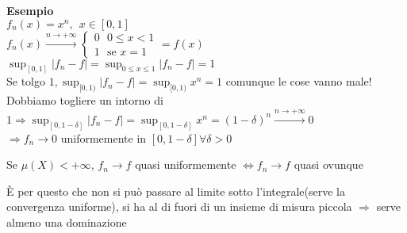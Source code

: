 \documentclass[12px]{article}
\begin{document}
\textbf{Esempio}\\
$f_n(x) = x^n, \ \ x\in [0,1]$\\
$f_n(x) \xrightarrow{ n \rightarrow+\infty} \begin{cases}
	0 \ \ \ 0\leq x < 1\\
	1 \ \ \ \text{se } x = 1
\end{cases}=f(x)$\\
$\sup_{[0,1]}|f_n-f| = \sup_{0\leq x\leq 1}|f_n-f| = 1$\\
Se tolgo  $1, \sup_{[0,1)}|f_n-f| = \sup_{[0,1)}x^n = 1$ comunque le cose vanno male!\\
Dobbiamo togliere un intorno di  $1 \Rightarrow \sup_{[0,1-\delta]}|f_n-f| = \sup_{[0,1-\delta]}x^n = (1-\delta)^n \xrightarrow{n \rightarrow +\infty}0 $ \\
$ \Rightarrow  f_n \rightarrow 0 $ uniformemente in $[0,1-\delta]\forall \delta > 0 $
\begin{teo}[Erogv]
	Se $\mu(X) < + \infty$, $f_n \rightarrow f$ quasi uniformemente $ \Leftrightarrow f_n \rightarrow f $ quasi ovunque
\end{teo}
È per questo che non si può passare al limite sotto l'integrale(serve la convergenza uniforme), si ha al di fuori di un insieme di misura piccola $ \Rightarrow  $ serve almeno una dominazione
\end{document}
